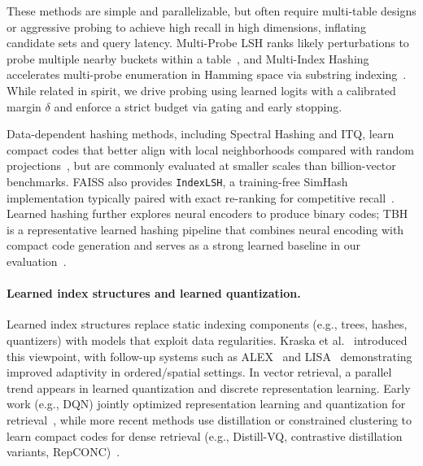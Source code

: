 \documentclass[sigconf, nonacm]{acmart}
\begin{document}
These methods are simple and parallelizable, but often require multi-table designs or aggressive probing to achieve high recall in high dimensions, inflating candidate sets and query latency. Multi-Probe LSH ranks likely perturbations to probe multiple nearby buckets within a table~\cite{10.5555/1325851.1325958}, and Multi-Index Hashing accelerates multi-probe enumeration in Hamming space via substring indexing~\cite{norouzi2014fastexactsearchhamming}. While related in spirit, we drive probing using learned logits with a calibrated margin $\delta$ and enforce a strict budget via gating and early stopping.

Data-dependent hashing methods, including Spectral Hashing and ITQ, learn compact codes that better align with local neighborhoods compared with random projections~\cite{NIPS2008_d58072be,inproceedings2011},
but are commonly evaluated at smaller scales than billion-vector benchmarks. FAISS also provides \texttt{IndexLSH}, a training-free SimHash implementation typically paired with exact re-ranking for competitive recall~\cite{ref40}. Learned hashing further explores neural encoders to produce binary codes; TBH is a representative learned hashing pipeline that combines neural encoding with compact code generation and serves as a strong learned baseline in our evaluation~\cite{tbh}.


\paragraph{Learned index structures and learned quantization.}
Learned index structures replace static indexing components (e.g., trees, hashes, quantizers) with
models that exploit data regularities. Kraska et al.~\cite{kraska2018case} introduced this viewpoint,
with follow-up systems such as ALEX~\cite{ding2020alex} and LISA~\cite{li2020lisa} demonstrating improved
adaptivity in ordered/spatial settings. In vector retrieval, a parallel
trend appears in learned quantization and discrete representation learning. Early work (e.g., DQN) jointly
optimized representation learning and quantization for retrieval~\cite{cao2016deepquantization}, while more
recent methods use distillation or constrained clustering to learn compact codes for dense retrieval
(e.g., Distill-VQ, contrastive distillation variants, RepCONC)~\cite{xiao2022distillvq,oneill2023improvedvq,zhan2023repconc}.
\end{document}

